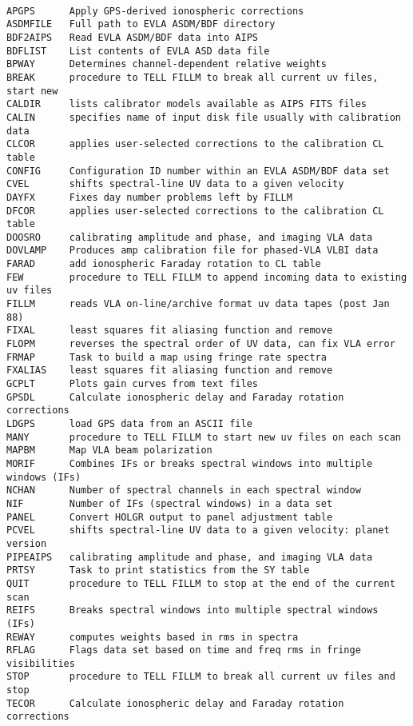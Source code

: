 \vskip 0.5pt
\bbve\begin{verbatim}

APGPS      Apply GPS-derived ionospheric corrections
ASDMFILE   Full path to EVLA ASDM/BDF directory
BDF2AIPS   Read EVLA ASDM/BDF data into AIPS
BDFLIST    List contents of EVLA ASD data file
BPWAY      Determines channel-dependent relative weights
BREAK      procedure to TELL FILLM to break all current uv files, start new
CALDIR     lists calibrator models available as AIPS FITS files
CALIN      specifies name of input disk file usually with calibration data
CLCOR      applies user-selected corrections to the calibration CL table
CONFIG     Configuration ID number within an EVLA ASDM/BDF data set
CVEL       shifts spectral-line UV data to a given velocity
DAYFX      Fixes day number problems left by FILLM
DFCOR      applies user-selected corrections to the calibration CL table
DOOSRO     calibrating amplitude and phase, and imaging VLA data
DOVLAMP    Produces amp calibration file for phased-VLA VLBI data
FARAD      add ionospheric Faraday rotation to CL table
FEW        procedure to TELL FILLM to append incoming data to existing uv files
FILLM      reads VLA on-line/archive format uv data tapes (post Jan 88)
FIXAL      least squares fit aliasing function and remove
FLOPM      reverses the spectral order of UV data, can fix VLA error
FRMAP      Task to build a map using fringe rate spectra
FXALIAS    least squares fit aliasing function and remove
GCPLT      Plots gain curves from text files
GPSDL      Calculate ionospheric delay and Faraday rotation corrections
LDGPS      load GPS data from an ASCII file
MANY       procedure to TELL FILLM to start new uv files on each scan
MAPBM      Map VLA beam polarization
MORIF      Combines IFs or breaks spectral windows into multiple windows (IFs)
NCHAN      Number of spectral channels in each spectral window
NIF        Number of IFs (spectral windows) in a data set
PANEL      Convert HOLGR output to panel adjustment table
PCVEL      shifts spectral-line UV data to a given velocity: planet version
PIPEAIPS   calibrating amplitude and phase, and imaging VLA data
PRTSY      Task to print statistics from the SY table
QUIT       procedure to TELL FILLM to stop at the end of the current scan
REIFS      Breaks spectral windows into multiple spectral windows (IFs)
REWAY      computes weights based in rms in spectra
RFLAG      Flags data set based on time and freq rms in fringe visibilities
STOP       procedure to TELL FILLM to break all current uv files and stop
TECOR      Calculate ionospheric delay and Faraday rotation corrections

\end{verbatim}
